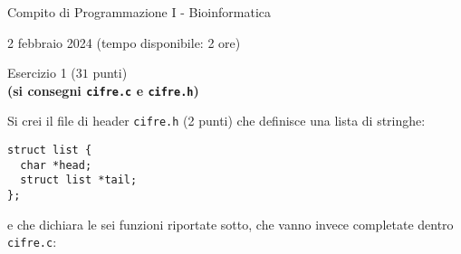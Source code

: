 \documentclass[12pt]{article}
\begin{document}
\begin{center}{\LARGE Compito di Programmazione I - Bioinformatica}\\
\begin{center}
  \large 2 febbraio 2024 (tempo disponibile: 2 ore)
\end{center}
\end{center}

\vspace*{1ex}
\begin{center}{\Large Esercizio 1} ($31$ punti)\\
  \textbf{(si consegni \texttt{cifre.c} e \texttt{cifre.h})}
\end{center}

Si crei il file di header \texttt{cifre.h} (2 punti) che definisce una lista di stringhe:
%
\begin{center}
  \begin{lstlisting}[language=myC]
struct list {
  char *head;
  struct list *tail;
};
  \end{lstlisting}
\end{center}
%
e che dichiara le sei funzioni riportate sotto,
che vanno invece completate dentro \texttt{cifre.c}:
\end{document}
